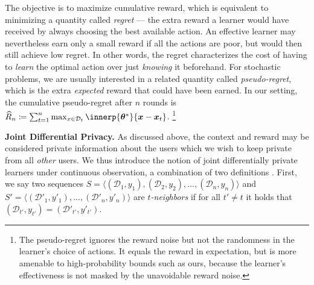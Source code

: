 \documentclass{article}
\newcommand{\os}[1]{\textcolor{red}{Or's comment:~\textbf{#1}}}
\renewcommand{\vec}[1]{\bm{#1}}
\newcommand{\defeq}{\coloneq}
\newcommand{\D}{\mathcal{D}}
\renewcommand{\paragraph}[1]{\vspace{2pt}\noindent\textbf{#1}}
\begin{document}
The objective is to maximize cumulative reward, which is equivalent to
minimizing a quantity called \emph{regret} --- the extra reward a
learner would have received by always choosing the best available
action.  An effective learner may nevertheless earn only a small
reward if all the actions are poor, but would then still achieve low
regret.  In other words, the regret characterizes the cost of having
to \emph{learn} the optimal action over just \emph{knowing} it beforehand.
For stochastic problems, we are usually interested in a related
quantity called \emph{pseudo-regret}, which is the extra
\emph{expected} reward that could have been earned.  In our setting,
the cumulative pseudo-regret after $n$ rounds is
$\widehat{R}_n \defeq
\sum_{t=1}^n\max_{x\in\D_t}\innerp{\vec\theta^*}{\vec x - \vec x_t}$.%
\footnote{The pseudo-regret ignores the reward noise but not the
  randomness in the learner's choice of actions.  It equals the reward
  in expectation, but is more amenable to high-probability bounds such
  as ours, because the learner's effectiveness is not masked by the
  unavoidable reward noise.}


\paragraph{Joint Differential Privacy.}%
As discussed above, the context and reward may be considered private
information about the users which we wish to keep private from all
\emph{other} users. We thus introduce the notion of joint
differentially private learners under continuous observation, a
combination of two definitions \citep[given
in][]{KearnsMechanismDesign2014,DworkContinualObservation2010}. First,
we say two sequences
$S = \langle (\mathcal{D}_1, y_1), (\mathcal{D}_2, y_2), ...,
(\mathcal{D}_n, y_n) \rangle$ and
$S' = \langle (\mathcal{D}'_1, y'_1), ..., (\mathcal{D}'_n, y'_n)
\rangle$ are \emph{$t$-neighbors} if for all $t'\neq t$ it holds that
$(\mathcal{D}_{t'},y_{t'}) = (\mathcal{D}'_{t'}, y'_{t'})$.
\end{document}

